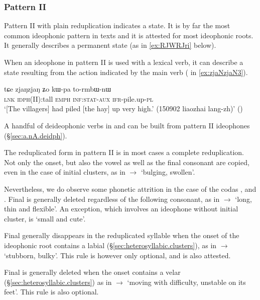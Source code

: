 \subsubsection{Pattern II} \label{sec:ideo.II}
Pattern II with plain reduplication indicates a state. It is by far the most common ideophonic pattern in texts and it is attested for most ideophonic roots.  It generally describes  a permanent state (as in \ref{ex:RJWRJri} below).

When an ideophone in pattern II is used with a lexical verb, it can describe a state resulting from the action indicated by the main verb ( in \ref{ex:zjaNzjaN3}).

  \begin{exe} 
\ex  \label{ex:zjaNzjaN3}
\gll  tɕe zjaŋzjaŋ ʑo kɯ-pa to-rmbɯ-nɯ \\
\textsc{lnk} \textsc{idph}(II):tall \textsc{emph} \textsc{inf}:\textsc{stat}-\textsc{aux} \textsc{ifr}-pile.up-\textsc{pl} \\
 \glt `[The villagers] had piled [the hay] up very high.' (150902 liaozhai lang-zh)'
()
  \end{exe}
  
A handful of deideophonic verbs in  and  can be built from pattern II ideophones (§\ref{sec:a.nA.deidph}).
 
 The reduplicated form in pattern II is in most cases a complete reduplication. Not only the onset, but also the vowel as well as the final consonant are copied, even in the case of initial clusters, as in  $\rightarrow$  `bulging, swollen'. 

Nevertheless, we do observe some phonetic attrition in the case of  the codas ,  and . Final  is generally deleted regardless of the following consonant, as in   $\rightarrow$  `long, thin and flexible'. An exception, which involves an ideophone without initial cluster, is  `small and cute'.

Final  generally disappears in the reduplicated syllable when the onset of the ideophonic root contains a labial (§\ref{sec:heterosyllabic.clusters}), as in  $\rightarrow$   `stubborn, bulky'. This rule is however only optional, and  is also attested.

Final  is generally deleted when the onset contains a velar (§\ref{sec:heterosyllabic.clusters}) as in  $\rightarrow$  `moving with difficulty, unstable on its feet'. This rule is also optional.

